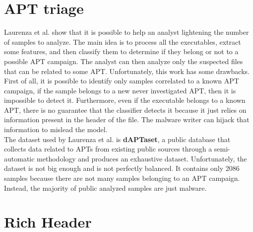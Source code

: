 \section{APT triage}
Laurenza et al. show that it is possible to help an analyst lightening the number of samples to analyze. The main idea is to process all the executables, extract some features, and then classify them to determine if they belong or not to a possible APT campaign. The analyst can then analyze only the suspected files that can be related to some APT. Unfortunately, this work has some drawbacks. First of all, it is possible to identify only samples correlated to a known APT campaign, if the sample belongs to a new never investigated APT, then it is impossible to detect it. Furthermore, even if the executable belongs to a known APT, there is no guarantee that the classifier detects it because it just relies on information present in the header of the file. The malware writer can hijack that information to mislead the model. \\


The dataset used by Laurenza et al. is \textbf{dAPTaset}, a public database that collects data related to APTs from existing public sources through a semi-automatic methodology and produces an exhaustive dataset. Unfortunately, the dataset is not big enough and is not perfectly balanced. It contains only 2086 samples because there are not many samples belonging to an APT campaign. Instead, the majority of public analyzed samples are just malware.

\section{Rich Header}

